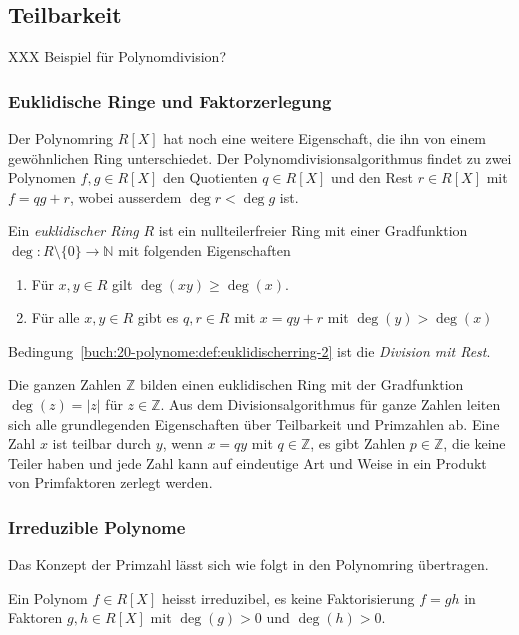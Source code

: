%
%
\subsection{Teilbarkeit
\label{buch:subsection:polynome:teilbarkeit}}
XXX Beispiel für Polynomdivision?

\subsubsection{Euklidische Ringe und Faktorzerlegung}
Der Polynomring $R[X]$ hat noch eine weitere Eigenschaft, die ihn
von einem gewöhnlichen Ring unterschiedet.
Der Polynomdivisionsalgorithmus findet zu zwei Polynomen $f,g\in R[X]$
den Quotienten $q\in R[X]$ und den Rest $r\in R[X]$ mit
$f=qg+r$, wobei ausserdem $\deg r<\deg g$ ist.

\begin{definition}
Ein {\em euklidischer Ring} $R$ ist ein nullteilerfreier Ring mit einer
Gradfunktion $\deg\colon R\setminus\{0\}\to\mathbb{N}$ mit folgenden
Eigenschaften
\begin{enumerate}
\item Für $x,y\in R$ gilt $\deg(xy) \ge \deg(x)$.
\item Für alle $x,y\in R$ gibt es $q,r\in R$ mit $x=qy+r$ mit
$\deg(y)>\deg(x)$
\label{buch:20-polynome:def:euklidischerring-2}
\end{enumerate}
Bedingung~\ref{buch:20-polynome:def:euklidischerring-2} ist die
{\em Division mit Rest}.
%
%
%
\end{definition}

Die ganzen Zahlen $\mathbb{Z}$ bilden einen euklidischen Ring mit der 
Gradfunktion $\deg(z)=|z|$ für $z\in \mathbb{Z}$.
Aus dem Divisionsalgorithmus für ganze Zahlen leiten sich alle grundlegenden
Eigenschaften über Teilbarkeit und Primzahlen ab.
Eine Zahl $x$ ist teilbar durch $y$, wenn $x=qy$ mit $q\in \mathbb{Z}$,
es gibt Zahlen $p\in\mathbb{Z}$, die keine Teiler haben und jede Zahl
kann auf eindeutige Art und Weise in ein Produkt von Primfaktoren
zerlegt werden.

\subsubsection{Irreduzible Polynome}
Das Konzept der Primzahl lässt sich wie folgt in den Polynomring übertragen.

\begin{definition}
Ein Polynom $f\in R[X]$ heisst irreduzibel, es keine Faktorisierung $f=gh$
in Faktoren $g,h\in R[X]$ mit $\deg(g)>0$ und $\deg(h) >0$.
\end{definition}

